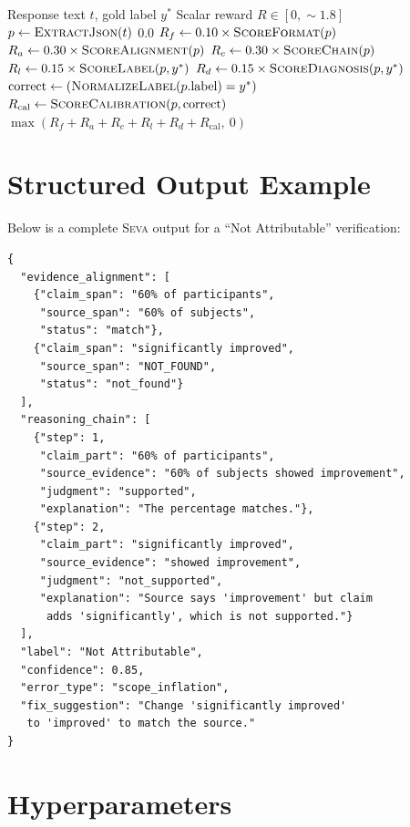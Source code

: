 \documentclass{article}
\newcommand{\seva}{\textsc{Seva}}
\begin{document}
\begin{algorithm}[h]
\caption{SEVA Process Reward Computation}
\label{alg:reward}
\begin{algorithmic}[1]
\REQUIRE Response text $t$, gold label $y^*$
\ENSURE Scalar reward $R \in [0, \sim\!1.8]$
\STATE $p \leftarrow \textsc{ExtractJson}(t)$
  \RETURN $0.0$
\ENDIF
\STATE $R_f \leftarrow 0.10 \times \textsc{ScoreFormat}(p)$
\STATE $R_a \leftarrow 0.30 \times \textsc{ScoreAlignment}(p)$
\STATE $R_c \leftarrow 0.30 \times \textsc{ScoreChain}(p)$
\STATE $R_l \leftarrow 0.15 \times \textsc{ScoreLabel}(p, y^*)$
\STATE $R_d \leftarrow 0.15 \times \textsc{ScoreDiagnosis}(p, y^*)$
\STATE $\text{correct} \leftarrow (\textsc{NormalizeLabel}(p.\text{label}) = y^*)$
\STATE $R_{\text{cal}} \leftarrow \textsc{ScoreCalibration}(p, \text{correct})$
\RETURN $\max(R_f + R_a + R_c + R_l + R_d + R_{\text{cal}},\ 0)$
\end{algorithmic}
\end{algorithm}


\section{Structured Output Example}
\label{app:example}

Below is a complete \seva{} output for a ``Not Attributable'' verification:

\begin{verbatim}
{
  "evidence_alignment": [
    {"claim_span": "60% of participants",
     "source_span": "60% of subjects",
     "status": "match"},
    {"claim_span": "significantly improved",
     "source_span": "NOT_FOUND",
     "status": "not_found"}
  ],
  "reasoning_chain": [
    {"step": 1,
     "claim_part": "60% of participants",
     "source_evidence": "60% of subjects showed improvement",
     "judgment": "supported",
     "explanation": "The percentage matches."},
    {"step": 2,
     "claim_part": "significantly improved",
     "source_evidence": "showed improvement",
     "judgment": "not_supported",
     "explanation": "Source says 'improvement' but claim
      adds 'significantly', which is not supported."}
  ],
  "label": "Not Attributable",
  "confidence": 0.85,
  "error_type": "scope_inflation",
  "fix_suggestion": "Change 'significantly improved'
   to 'improved' to match the source."
}
\end{verbatim}


\section{Hyperparameters}
\label{app:hyperparams}
\end{document}
